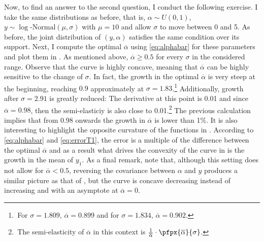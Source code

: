 \documentclass[english, a4paper, 12pt]{article}
\begin{document}
Now, to find an answer to the second question, I conduct the following exercise. I take the same distributions as before, that is, $\alpha \sim U(0,1)$, $y \sim \log\text{-Normal}(\mu, \sigma)$ with $\mu = 10$ and allow $\sigma$ to move between 0 and 5. As before, the joint distribution of $(y,\alpha)$ satisfies the same condition over its support. Next, I compute the optimal $\overline{\alpha}$ using \eqref{eq:alphabar} for these parameters and plot them in . As mentioned above, $\overline{\alpha} \geq 0.5$ for every $\sigma$ in the considered range. Observe that the curve is highly concave, meaning that $\overline{\alpha}$ can be highly sensitive to the change of $\sigma$. In fact, the growth in the optimal $\overline{\alpha}$ is very steep at the beginning, reaching $0.9$ approximately at $\sigma = 1.83$.\footnote{\,For $\sigma = 1.809$, $\overline{\alpha} = 0.899$ and for $\sigma = 1.834$, $\overline{\alpha} = 0.902$.} Additionally, growth after $\sigma = 2.91$ is greatly reduced: The derivative at this point is 0.01 and since $\overline{\alpha} = 0.98$, then the semi-elasticiy is also close to 0.01.\footnote{\,The semi-elasticity of $\overline{\alpha}$ in this context is $\frac{1}{\overline{\alpha}} \cdot \pfpx{\overline{\alpha}}{\sigma}$.} The previous calculation implies that from 0.98 onwards the growth in $\overline{\alpha}$ is lower than 1\%.  It is also interesting to highlight the opposite curvature of the functions in . According to \eqref{eq:alphabar} and \eqref{eq:errorT1}, the error is a multiple of the difference between the optimal $\overline{\alpha}$ and as a result what drives the convexity of the curve in  is the growth in the mean of $y_{1}$. As a final remark, note that, although this setting does not allow for $\overline{\alpha} < 0.5$, reversing the covariance between $\alpha$ and $y$ produces a similar picture as that of , but the curve is concave decreasing instead of increasing and with an asymptote at $\overline{\alpha} = 0$.
\vfill
\end{document}
